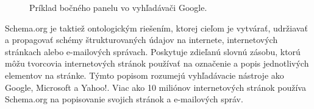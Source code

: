 \documentclass[12pt, a4paper, oneside]{book}
\begin{document}
\begin{figure}[h]
\label{fig:semantic_web}
\caption{Príklad bočného panelu vo vyhľadávači Google.}
\end{figure}

Schema.org \cite{schemaOrg} je taktiež ontologickým riešením, ktorej cieľom je vytvárať, udržiavať a propagovať schémy štrukturovaných údajov na internete, internetových stránkach alebo e-mailových správach. Poskytuje zdieľanú slovnú zásobu, ktorú môžu tvorcovia internetových stránok používať na označenie a popis jednotlivých elementov na stránke. Týmto popisom rozumejú vyhľadávacie nástroje ako Google, Microsoft a Yahoo!. Viac ako 10 miliónov internetových stránok používa Schema.org na popisovanie svojich stránok a e-mailových správ.

\end{document}
